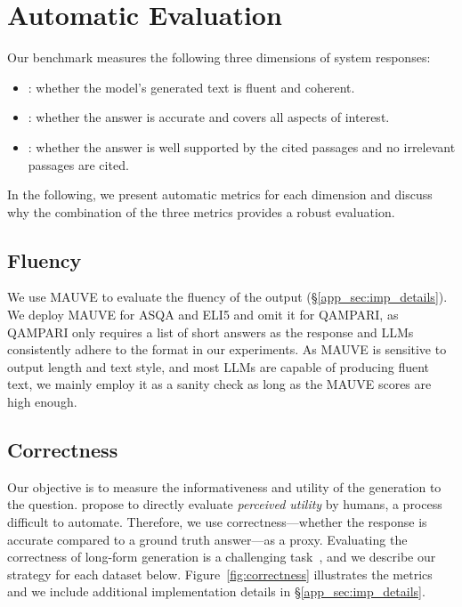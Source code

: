 



\section{Automatic Evaluation}




\vspace{-3pt}
Our benchmark measures the following three dimensions of system responses:
\vspace{-3pt}
\begin{itemize}[leftmargin=1em,itemsep=0pt]
    \item {}: whether the model's generated text is fluent and coherent.
    \item {}: whether the answer is accurate and covers all aspects of interest.
    \item {}: whether the answer is well supported by the cited passages and no irrelevant passages are cited.
\end{itemize}
\vspace{-3pt}
In the following, we present automatic metrics for each dimension 
and discuss why the combination of the three metrics provides a robust evaluation. %



\subsection{Fluency} 
We use MAUVE \cite{pillutla2021mauve} to evaluate the fluency of the output (\S\ref{app_sec:imp_details}).
We deploy MAUVE for ASQA and ELI5
and omit it for QAMPARI,
as QAMPARI 
only requires a list of short answers as the response
and LLMs consistently adhere to the format  in our experiments.
As MAUVE is sensitive to output length and text style, and most LLMs are capable of producing fluent text,
we mainly employ it as a sanity check as long as the MAUVE scores are high enough.



\subsection{Correctness}
\label{sec:correctness}





Our objective is to measure the informativeness and utility of the generation  to the question. 
\citet{liu2023evaluating} propose to directly evaluate \textit{perceived utility}
by humans, a process difficult to automate. 
Therefore, we use correctness---whether the response is accurate compared to a ground truth answer---as a proxy.
Evaluating the correctness of long-form generation is a challenging task~\citep{krishna-etal-2021-hurdles},
and we describe our strategy for each dataset below.
Figure~\ref{fig:correctness} illustrates the metrics and we include additional implementation details in \S\ref{app_sec:imp_details}.


